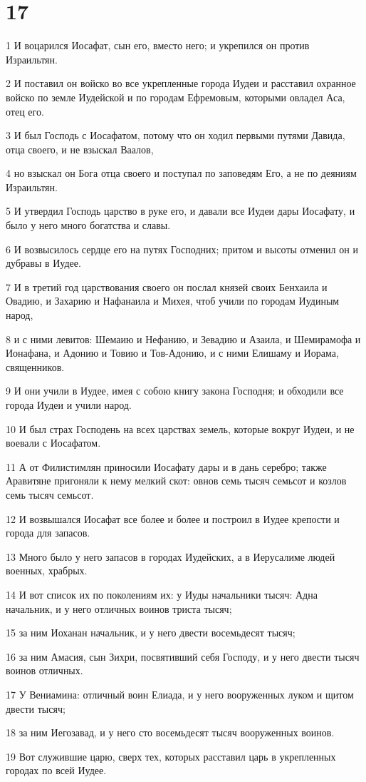 \chapter{17}

\par 1 И воцарился Иосафат, сын его, вместо него; и укрепился он против Израильтян.
\par 2 И поставил он войско во все укрепленные города Иудеи и расставил охранное войско по земле Иудейской и по городам Ефремовым, которыми овладел Аса, отец его.
\par 3 И был Господь с Иосафатом, потому что он ходил первыми путями Давида, отца своего, и не взыскал Ваалов,
\par 4 но взыскал он Бога отца своего и поступал по заповедям Его, а не по деяниям Израильтян.
\par 5 И утвердил Господь царство в руке его, и давали все Иудеи дары Иосафату, и было у него много богатства и славы.
\par 6 И возвысилось сердце его на путях Господних; притом и высоты отменил он и дубравы в Иудее.
\par 7 И в третий год царствования своего он послал князей своих Бенхаила и Овадию, и Захарию и Нафанаила и Михея, чтоб учили по городам Иудиным народ,
\par 8 и с ними левитов: Шемаию и Нефанию, и Зевадию и Азаила, и Шемирамофа и Ионафана, и Адонию и Товию и Тов-Адонию, и с ними Елишаму и Иорама, священников.
\par 9 И они учили в Иудее, имея с собою книгу закона Господня; и обходили все города Иудеи и учили народ.
\par 10 И был страх Господень на всех царствах земель, которые вокруг Иудеи, и не воевали с Иосафатом.
\par 11 А от Филистимлян приносили Иосафату дары и в дань серебро; также Аравитяне пригоняли к нему мелкий скот: овнов семь тысяч семьсот и козлов семь тысяч семьсот.
\par 12 И возвышался Иосафат все более и более и построил в Иудее крепости и города для запасов.
\par 13 Много было у него запасов в городах Иудейских, а в Иерусалиме людей военных, храбрых.
\par 14 И вот список их по поколениям их: у Иуды начальники тысяч: Адна начальник, и у него отличных воинов триста тысяч;
\par 15 за ним Иоханан начальник, и у него двести восемьдесят тысяч;
\par 16 за ним Амасия, сын Зихри, посвятивший себя Господу, и у него двести тысяч воинов отличных.
\par 17 У Вениамина: отличный воин Елиада, и у него вооруженных луком и щитом двести тысяч;
\par 18 за ним Иегозавад, и у него сто восемьдесят тысяч вооруженных воинов.
\par 19 Вот служившие царю, сверх тех, которых расставил царь в укрепленных городах по всей Иудее.

